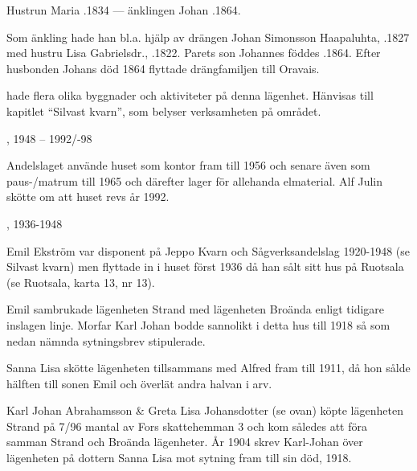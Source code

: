 Hustrun Maria .1834 --- änklingen Johan .1864.

Som änkling hade han bl.a. hjälp av drängen Johan Simonsson Haapaluhta, .1827 med hustru Lisa Gabrielsdr., .1822. Parets son Johannes föddes .1864. Efter husbonden Johans död 1864 flyttade drängfamiljen till Oravais.



%


%

 hade flera olika byggnader och aktiviteter på denna lägenhet. Hänvisas till kapitlet ``Silvast kvarn'', som belyser verksamheten på området.


, 1948 – 1992/-98

Andelslaget använde huset som kontor fram till 1956 och senare även som paus-/matrum till 1965 och därefter lager för allehanda elmaterial. Alf Julin skötte om att huset revs år 1992.


, 1936-1948

Emil Ekström var disponent på Jeppo Kvarn och Sågverksandelslag 1920-1948 (se Silvast kvarn) men flyttade in i huset först 1936 då han sålt sitt hus på Ruotsala (se Ruotsala, karta 13, nr 13).


%
Emil sambrukade lägenheten Strand med lägenheten Broända enligt tidigare inslagen linje. Morfar Karl Johan bodde sannolikt i detta hus till 1918 så som nedan nämnda sytningsbrev stipulerade.\jhvspace{}


%
Sanna Lisa skötte lägenheten tillsammans med Alfred fram till 1911,	då hon sålde hälften till sonen Emil och överlät andra halvan i arv.\jhvspace{}


%
Karl Johan Abrahamsson \& Greta Lisa Johansdotter (se ovan) köpte lägenheten Strand på 7/96 mantal av Fors skattehemman 3 och kom således att föra samman Strand och Broända lägenheter. År 1904 skrev Karl-Johan över lägenheten på dottern Sanna Lisa mot sytning fram till sin död, 1918.


